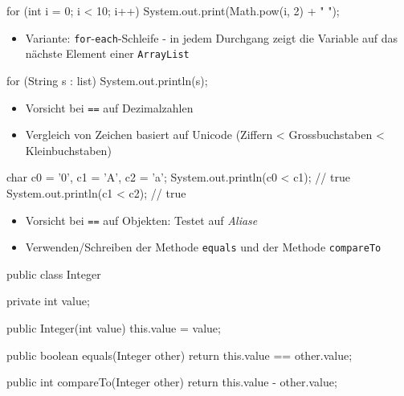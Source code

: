 \documentclass[a4paper,10pt, dvipsnames]{report}
\begin{document}
\begin{javacodebox}
for (int i = 0; i < 10; i++)
    System.out.print(Math.pow(i, 2) + " ");
\end{javacodebox}

\begin{itemize}
    \item Variante: \texttt{for}-\texttt{each}-Schleife - in jedem Durchgang zeigt die Variable auf das nächste Element einer \texttt{ArrayList}
\end{itemize}

\begin{javacodebox}
for (String s : list)
    System.out.println(s);
\end{javacodebox}

\begin{itemize}
    \item Vorsicht bei \texttt{==} auf Dezimalzahlen
\end{itemize}

\begin{javacodebox}
final double TOLERANCE = 0.00000001;
if (Math.abs(num1 - num2) < TOLERANCE) {
\end{javacodebox}

\begin{itemize}
    \item Vergleich von Zeichen basiert auf Unicode (Ziffern < Grossbuchstaben < Kleinbuchstaben)
\end{itemize}

\begin{javacodebox}
char c0 = '0', c1 = 'A', c2 = 'a';
System.out.println(c0 < c1); // true
System.out.println(c1 < c2); // true
\end{javacodebox}

\begin{itemize}
    \item Vorsicht bei \texttt{==} auf Objekten: Testet auf \textit{Aliase}
    \item Verwenden/Schreiben der Methode \texttt{equals} und der Methode \texttt{compareTo}
\end{itemize}

\begin{javacodebox}
public class Integer {

    private int value;

    public Integer(int value) {
    this.value = value;
    }

    public boolean equals(Integer other) {
    return this.value == other.value;
    }

    public int compareTo(Integer other) {
    return this.value - other.value;
    }
}
\end{javacodebox}
\end{document}
